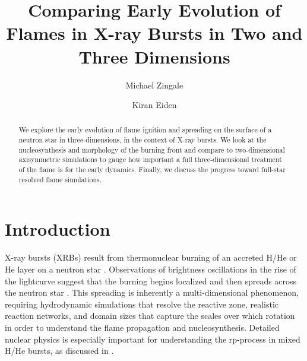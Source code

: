 \documentclass[twocolumn,linenumbers,times,tighten]{aastex631}
\begin{document}
\title{Comparing Early Evolution of Flames in X-ray Bursts in Two and Three Dimensions}


\author[0000-0001-8401-030X]{Michael Zingale}

\author[0000-0001-6191-4285]{Kiran Eiden}




\begin{abstract}
We explore the early evolution of flame ignition and spreading on the
surface of a neutron star in three-dimensions, in the context of X-ray
bursts.  We look at the nucleosynthesis and morphology of the burning
front and compare to two-dimensional axisymmetric simulations to gauge
how important a full three-dimensional treatment of the flame is for
the early dynamics.  Finally, we discuss the progress toward full-star
resolved flame simulations.\end{abstract}


\section{Introduction}\label{Sec:Introduction}

X-ray bursts (XRBs) result from thermonuclear burning of an accreted
H/He or He layer on a neutron star \citep{galloway:2017}.
Observations of brightness oscillations in the rise of the lightcurve
suggest that the burning begins localized and then spreads across the
neutron star \citep{bhattacharyya:2007}. 
This spreading is inherently
a multi-dimensional phenomenon, requiring hydrodynamic simulations that
resolve the reactive zone, realistic reaction networks, and
domain sizes that capture the scales over which rotation in order to
understand the flame propagation and nucleosynthesis.  Detailed
nuclear physics is especially important for understanding the 
rp-process in mixed H/He bursts, as discussed in \citealt{rpprocess}.
\end{document}
